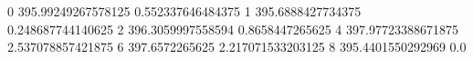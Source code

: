 0 395.99249267578125 0.552337646484375
1 395.6888427734375 0.248687744140625
2 396.3059997558594 0.8658447265625
4 397.97723388671875 2.537078857421875
6 397.6572265625 2.217071533203125
8 395.4401550292969 0.0

